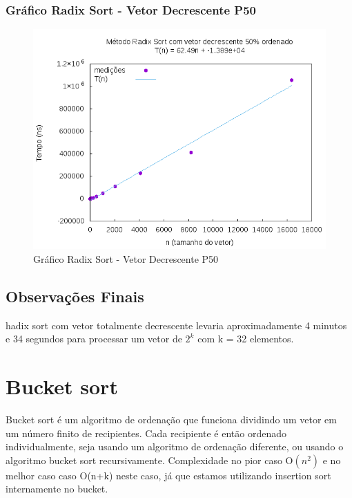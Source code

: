 \documentclass[12pt,a4paper,twoside]{report}
\begin{document}
\subsection{Gráfico Radix Sort - Vetor Decrescente P50}
\begin{figure}[H]
    \centering
    \includegraphics[width=0.7\linewidth]{graficos/RadixSort/vIntDecrescenteP50/vIntDecrescenteP50.png}
  \caption{Gráfico Radix Sort - Vetor Decrescente P50}
\end{figure}
\section{Observações Finais}
hadix sort com vetor totalmente decrescente levaria aproximadamente 4 minutos e 34 segundos para processar um vetor de $2^k$ com k = 32 elementos.

\chapter{Bucket sort}
Bucket sort é um algoritmo de ordenação que funciona dividindo um vetor em um número finito de recipientes. Cada recipiente é então ordenado individualmente, seja usando um algoritmo de ordenação diferente, ou usando o algoritmo bucket sort recursivamente. Complexidade no pior caso O$(n^2)$ e no melhor caso caso O(n+k) neste caso, já que estamos utilizando insertion sort internamente no bucket.
\end{document}
